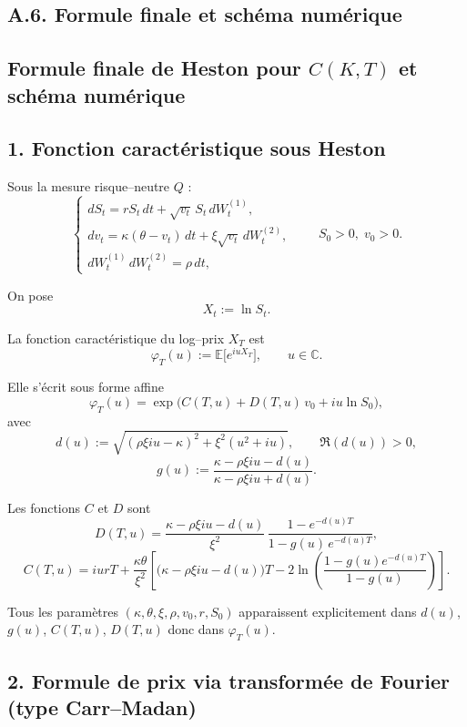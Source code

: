 \documentclass[11pt,a4paper]{article}
\newcommand{\1}{\mathbf{1}}
\begin{document}
\subsection*{A.6. Formule finale et sch\'ema num\'erique}


\subsection*{Formule finale de Heston pour $C(K,T)$ et sch\'ema num\'erique}

\subsection*{1. Fonction caract\'eristique sous Heston}

Sous la mesure risque--neutre $Q$ :
\[
\begin{cases}
dS_t = r S_t\,dt + \sqrt{v_t}\,S_t\,dW_t^{(1)}, \\[3pt]
dv_t = \kappa(\theta - v_t)\,dt + \xi\sqrt{v_t}\,dW_t^{(2)}, \\[3pt]
dW_t^{(1)}\,dW_t^{(2)} = \rho\,dt,
\end{cases}
\qquad S_0>0,\; v_0>0.
\]

On pose
\[
X_t := \ln S_t .
\]

La fonction caract\'eristique du log--prix $X_T$ est
\[
\varphi_T(u) := \mathbb{E}\big[e^{iuX_T}\big], \qquad u\in\mathbb{C}.
\]

Elle s'\'ecrit sous forme affine
\[
\boxed{\displaystyle
\varphi_T(u)
= \exp\Big(C(T,u) + D(T,u)\,v_0 + iu\ln S_0\Big),
}
\]
avec
\[
d(u) := \sqrt{(\rho\xi iu - \kappa)^2 + \xi^2(u^2+iu)},
\qquad \Re(d(u))>0,
\]
\[
g(u) := \frac{\kappa - \rho\xi iu - d(u)}{\kappa - \rho\xi iu + d(u)}.
\]

Les fonctions $C$ et $D$ sont
\[
\boxed{\displaystyle
D(T,u)
= \frac{\kappa - \rho\xi iu - d(u)}{\xi^2}
  \,\frac{1 - e^{-d(u)T}}{1 - g(u)\,e^{-d(u)T}},
}
\]
\[
\boxed{\displaystyle
C(T,u)
= iurT
+ \frac{\kappa\theta}{\xi^2}
  \left[
    \big(\kappa - \rho\xi iu - d(u)\big)T
    - 2\ln\!\left(\frac{1 - g(u)e^{-d(u)T}}{1 - g(u)}\right)
  \right].
}
\]

Tous les param\`etres $(\kappa,\theta,\xi,\rho,v_0,r,S_0)$ apparaissent
explicitement dans $d(u)$, $g(u)$, $C(T,u)$, $D(T,u)$ donc dans $\varphi_T(u)$.

\subsection*{2. Formule de prix via transform\'ee de Fourier (type Carr--Madan)}
\end{document}
